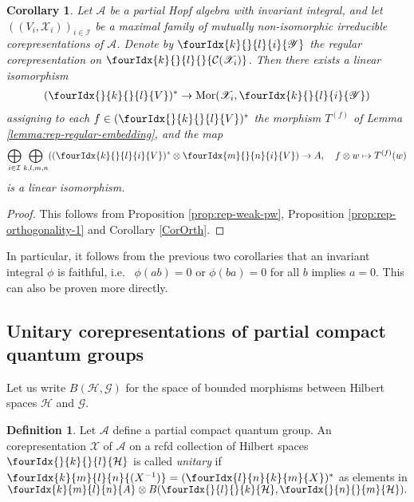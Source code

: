\documentclass[10pt]{article}
\newcommand{\dual}[1]{#1^{*}}
\newcommand{\Hsp}{\mathcal{H}}
\newcommand{\Mor}{\mathrm{Mor}}
\newcommand{\Gr}[5]{\fourIdx{#2}{#4}{#3}{#5}{#1}}%
\newcommand{\Gru}[3]{\Gr{#1}{}{}{#2}{#3}}
\newcommand{\Grd}[3]{\Gr{#1}{#2}{#3}{}{}}
\newtheorem{Cor}[Theorem]{Corollary}
\theoremstyle{definition}
\newtheorem{Def}[Theorem]{Definition}
\numberwithin{equation}{section}
\begin{document}
\begin{Cor} \label{cor:rep-pw}
  Let $\mathscr{A}$ be a partial Hopf algebra with invariant integral, and let
  $((V_{i},\mathscr{X}_{i}))_{i \in \mathcal{I}}$ be a maximal family of mutually non-isomorphic irreducible corepresentations of
  $\mathscr{A}$. Denote by $\Gr{\mathscr{Y}}{k}{l}{}{i}$
  the regular corepresentation on
  $\Grd{\mathcal{C}(\mathscr{X}_i)}{k}{l}$. Then there exists a
  linear isomorphism
  \begin{align*}
    \dual{( \Gru{V}{k}{l})} \to
    \Mor(\mathscr{X}_{i},
    \Gr{\mathscr{Y}}{k}{l}{}{i})
  \end{align*}
  assigning to each $f\in     \dual{( \Gru{V}{k}{l})}$ the morphism
  $T^{(f)}$ of Lemma \ref{lemma:rep-regular-embedding}, and the map  
  \begin{align*}
    \bigoplus_{i \in \mathcal{I}} \bigoplus_{k,l,m,n}
    (\dual{(\Gr{V}{k}{l}{}{i})} \otimes
    \Gr{V}{m}{n}{}{i}) \to A,\quad f \otimes w \mapsto T^{(f)}(w)
  \end{align*}
  is a linear isomorphism. 
\end{Cor}
\begin{proof} This follows from Proposition \ref{prop:rep-weak-pw}, Proposition \ref{prop:rep-orthogonality-1} and Corollary \ref{CorOrth}.
\end{proof}

In particular, it follows from the previous two corollaries that an invariant integral $\phi$ is faithful, i.e.~ $\phi(ab)=0$ or $\phi(ba)=0$ for all $b$ implies $a=0$. This can also be proven more directly.

\subsection{Unitary corepresentations of partial compact quantum groups}


Let us write $B(\Hsp,\mathcal{G})$ for the space of
bounded morphisms between Hilbert spaces $\Hsp$ and $\mathcal{G}$. 

\begin{Def} Let $\mathscr{A}$ define a partial compact quantum
  group. An corepresentation $\mathscr{X}$ of $\mathscr{A}$ on a rcfd collection of Hilbert spaces $\Gru{\Hsp}{k}{l}$ is called
   \emph{unitary}
  if $\Gr{(X^{-1})}{k}{l}{m}{n}=(\Gr{X}{l}{k}{n}{m})^{*}$ as elements in $\Gr{A}{k}{l}{m}{n}\otimes
  B(\Gru{\Hsp}{l}{k},\Gru{\Hsp}{n}{m}).$
\end{Def} 
\end{document}

